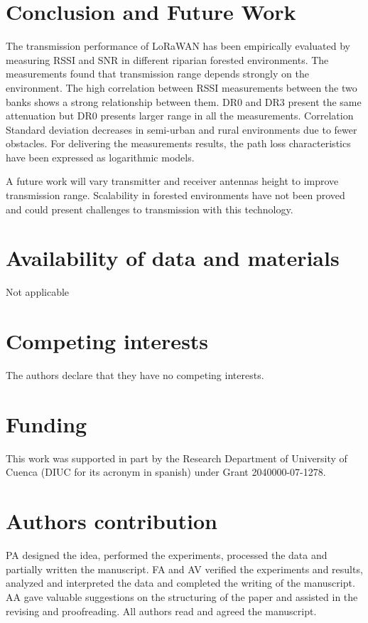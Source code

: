 

\section{Conclusion and Future Work}

The transmission performance of LoRaWAN has been empirically evaluated by measuring RSSI and SNR in different riparian forested environments. The measurements found that transmission range depends strongly on the environment. The high correlation between RSSI measurements between the two banks shows a strong relationship between them. DR$0$ and DR$3$ present the same attenuation but DR$0$ presents larger range in all the measurements. Correlation Standard deviation decreases in semi-urban and rural environments due to fewer obstacles. For delivering the measurements results, the path loss characteristics have been expressed as logarithmic models.

A future work will vary transmitter and receiver antennas height to improve transmission range. Scalability in forested environments have not been proved and could present challenges to transmission with this technology. 

\small 
\section*{Availability of data and materials}

Not applicable

\section*{Competing interests}

The authors declare that they have no competing interests.

\section*{Funding}

This work was supported in part by the Research Department of University of Cuenca (DIUC for its acronym in spanish) under Grant 2040000-07-1278. 

\section*{Authors contribution}

PA designed the idea, performed the experiments, processed the data and partially written the manuscript. FA and AV verified the experiments and results, analyzed and interpreted the data and completed the writing of the manuscript. AA gave valuable suggestions on the structuring of the paper and assisted in the revising and proofreading. All authors read and agreed the manuscript. 

